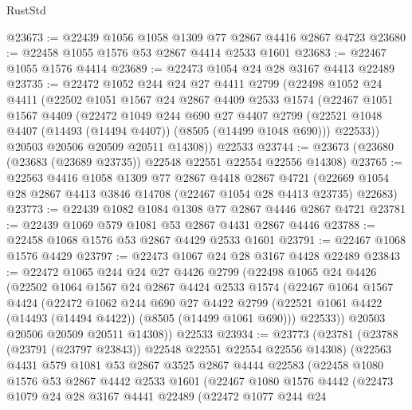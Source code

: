 \begin{lexlean}{RustStd}
\begin{coremodule}
@23673 := @22439 @1056 @1058 @1309 @77 @2867 @4416 @2867 @4723
@23680 := @22458 @1055 @1576 @53 @2867 @4414 @2533 @1601
@23683 := @22467 @1055 @1576 @4414
@23689 := @22473 @1054 @24 @28 @3167 @4413 @22489
@23735 := @22472
    @1052
    @244
    @24
    @27
    @4411
    @2799
    (@22498
      @1052
      @24
      @4411
      (@22502
        @1051
        @1567
        @24
        @2867
        @4409
        @2533
        @1574
        (@22467
          @1051
          @1567
          @4409
          (@22472
            @1049
            @244
            @690
            @27
            @4407
            @2799
            (@22521 @1048 @4407 (@14493 (@14494 @4407)) (@8505 (@14499 @1048 @690)))
            @22533))
        @20503
        @20506
        @20509
        @20511
        @14308))
    @22533
@23744 := @23673 (@23680 (@23683 (@23689 @23735)) @22548 @22551 @22554 @22556 @14308)
@23765 := @22563
    @4416
    @1058
    @1309
    @77
    @2867
    @4418
    @2867
    @4721
    (@22669 @1054 @28 @2867 @4413 @3846 @14708 (@22467 @1054 @28 @4413 @23735) @22683)
@23773 := @22439 @1082 @1084 @1308 @77 @2867 @4446 @2867 @4721
@23781 := @22439 @1069 @579 @1081 @53 @2867 @4431 @2867 @4446
@23788 := @22458 @1068 @1576 @53 @2867 @4429 @2533 @1601
@23791 := @22467 @1068 @1576 @4429
@23797 := @22473 @1067 @24 @28 @3167 @4428 @22489
@23843 := @22472
    @1065
    @244
    @24
    @27
    @4426
    @2799
    (@22498
      @1065
      @24
      @4426
      (@22502
        @1064
        @1567
        @24
        @2867
        @4424
        @2533
        @1574
        (@22467
          @1064
          @1567
          @4424
          (@22472
            @1062
            @244
            @690
            @27
            @4422
            @2799
            (@22521 @1061 @4422 (@14493 (@14494 @4422)) (@8505 (@14499 @1061 @690)))
            @22533))
        @20503
        @20506
        @20509
        @20511
        @14308))
    @22533
@23934 := @23773
    (@23781
      (@23788 (@23791 (@23797 @23843)) @22548 @22551 @22554 @22556 @14308)
      (@22563
        @4431
        @579
        @1081
        @53
        @2867
        @3525
        @2867
        @4444
        @22583
        (@22458
          @1080
          @1576
          @53
          @2867
          @4442
          @2533
          @1601
          (@22467
            @1080
            @1576
            @4442
            (@22473
              @1079
              @24
              @28
              @3167
              @4441
              @22489
              (@22472
                @1077
                @244
                @24

\end{coremodule}
\end{lexlean}
